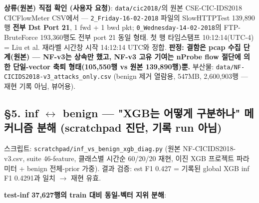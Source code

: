 \textbf{상류(원본) 직접 확인 (사용자 요청)}: \texttt{data/\allowbreak{}\allowbreak{}cic\allowbreak{}2018/\allowbreak{}\allowbreak{}}의 원본 CSE-CIC-IDS2018 CICFlowMeter CSV에서 — \texttt{2\_\allowbreak{}\allowbreak{}Friday\allowbreak{}-\allowbreak{}16-\allowbreak{}02-\allowbreak{}2\allowbreak{}018} 파일의 SlowHTTPTest 139,890행 \textbf{전부 Dst Port 21}, 1 fwd +\allowbreak{} 1 bwd pkt; \texttt{0\_\allowbreak{}\allowbreak{}Wednes\allowbreak{}day-\allowbreak{}14-\allowbreak{}0\allowbreak{}2-\allowbreak{}2018}의 FTP-BruteForce 193,360행도 전부 port 21 동일 형태. 첫 행 타임스탬프 10:12:14(UTC-4) =\allowbreak{} Liu et al. 재라벨 시간창 시작 14:12:14 UTC와 정합. \textbf{판정: 결함은 pcap 수집 단계(원본) — NF-v3는 상속만 했고, NF-v3 고유 기여는 nProbe flow 절단에 의한 단일-vector 축퇴 형태(105,550행 vs 원본 139,890행)뿐.} 부산물: \texttt{data/\allowbreak{}\allowbreak{}NF-\allowbreak{}CICIDS20\allowbreak{}18-\allowbreak{}v3\_\allowbreak{}\allowbreak{}at\allowbreak{}tacks\_\allowbreak{}\allowbreak{}on\allowbreak{}ly.\allowbreak{}csv} (benign 제거 열람용, 547MB, 2,600,903행 — 재현 기록 아님, 뷰어용).

\subsection{§5. inf \ensuremath{\leftrightarrow} benign — "XGB는 어떻게 구분하나" 메커니즘 분해 (scratchpad 진단, 기록 run 아님)}
스크립트: \texttt{scratchp\allowbreak{}ad/\allowbreak{}\allowbreak{}inf\_\allowbreak{}\allowbreak{}v\allowbreak{}s\_\allowbreak{}\allowbreak{}benign\allowbreak{}\_\allowbreak{}\allowbreak{}xgb\_\allowbreak{}\allowbreak{}dia\allowbreak{}g.\allowbreak{}py} (원본 NF-CICIDS2018-v3.csv, suite 46-feature, 클래스별 시간순 60/\allowbreak{}20/\allowbreak{}20 재현, 이진 XGB 프로젝트 파라미터 +\allowbreak{} benign 전체-prior 가중). 결과 검증: est F1 0.427 =\allowbreak{} 기록된 global XGB inf F1 0.4291과 일치  \ensuremath{\rightarrow}  재현 유효.

\textbf{test-inf 37,627행의 train 대비 동일-벡터 지위 분해}:

